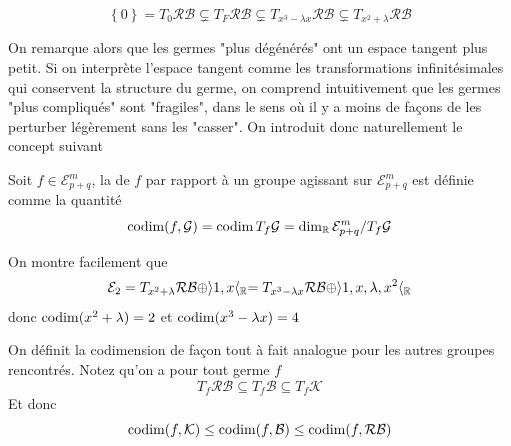 \documentclass[memoire.tex]{subfiles}
\begin{document}
\begin{equation*}
    \left\{0\right\}=T_0 \mathcal{RB}\subsetneq T_F\mathcal{RB}\subsetneq T_{x^3-\lambda x}\mathcal{RB}\subsetneq T_{x^2+\lambda}\mathcal{RB}
\end{equation*}

On remarque alors que les germes "plus 
dégénérés" ont un espace tangent plus petit. Si on interprète l'espace tangent comme les transformations infinitésimales qui conservent la structure du germe, on comprend intuitivement que les germes "plus compliqués" sont "fragiles", dans le sens où il y a moins de façons de les perturber légèrement sans les "casser".
On introduit donc naturellement le concept 
suivant

\begin{definition}
    Soit $f\in\mathcal{E}_{p+q}^m$, la  de $f$ par rapport à un groupe agissant sur $\mathcal{E}_{p+q}^m$  est définie comme la quantité
    \begin{equation*}
       \operatorname{codim}(f,\mathcal{G})=\operatorname{codim} T_f\mathcal{G}= \dim_{\mathbb{R}} \mathcal{E}^{m}_{p+q}/T_f\mathcal{G}
    \end{equation*}
\end{definition}
On montre facilement que
\begin{equation*}
    \mathcal{E}_2=T_{x^2+\lambda}\mathcal{RB}\oplus \rangle 1,x\langle_{\mathbb{R}}=
    T_{x^3-\lambda x}\mathcal{RB}\oplus \rangle 1,x,\lambda,x^2\langle_{\mathbb{R}}
\end{equation*}
donc $\operatorname{codim}(x^2+\lambda)=2$ et $\operatorname{codim}(x^3-\lambda x)=4$



\begin{remarque}
    On définit la codimension de façon tout à fait analogue pour les autres groupes rencontrés. Notez qu'on a
    pour tout germe $f$ 
    \begin{equation*}
        T_f \mathcal{RB}\subseteq T_f\mathcal{B}\subseteq T_f\mathcal{K}
    \end{equation*}
    Et donc
    \begin{equation*}
        \operatorname{codim}(f,\mathcal{K})
        \leq  \operatorname{codim}(f,\mathcal{B})
        \leq  \operatorname{codim}(f,\mathcal{RB})
    \end{equation*}
\end{remarque}
\end{document}
